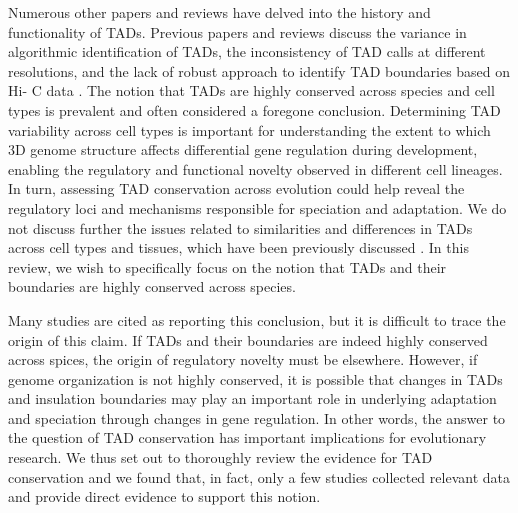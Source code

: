 Numerous other papers and reviews have delved into the history and functionality of TADs. Previous papers and reviews discuss the variance in algorithmic identification of TADs, the inconsistency of TAD calls at different resolutions, and the lack of robust approach to identify TAD boundaries based on Hi- C data \cite{Dixon.2016, Beagan.2020, Dali.2017, Forcato.2017, Zufferey.2018, Sikorska.2019, Andrey.2017, Franke.2018, Schoenfelder.2019, Rowley.2018, Fraser.2015, Ay.2015}. The notion that TADs are highly conserved across species and cell types is prevalent and often considered a foregone conclusion. Determining TAD variability across cell types is important for understanding the extent to which 3D genome structure affects differential gene regulation during development, enabling the regulatory and functional novelty observed in different cell lineages. In turn, assessing TAD conservation across evolution could help reveal the regulatory loci and mechanisms responsible for speciation and adaptation. We do not discuss further the issues related to similarities and differences in TADs across cell types and tissues, which have been previously discussed \cite{Andrey.2017, Sauerwald.2018, Sauerwald.2019, Schmitt.2016, Zheng.2019, Bonev.2016, Cubeñas-Potts.2015}. In this review, we wish to specifically focus on the notion that TADs and their boundaries are highly conserved across species.

Many studies are cited as reporting this conclusion, but it is difficult to trace the origin of this claim. If TADs and their boundaries are indeed highly conserved across spices, the origin of regulatory novelty must be elsewhere. However, if genome organization is not highly conserved, it is possible that changes in TADs and insulation boundaries may play an important role in underlying adaptation and speciation through changes in gene regulation. In other words, the answer to the question of TAD conservation has important implications for evolutionary research. We thus set out to thoroughly review the evidence for TAD conservation and we found that, in fact, only a few studies collected relevant data and provide direct evidence to support this notion.

